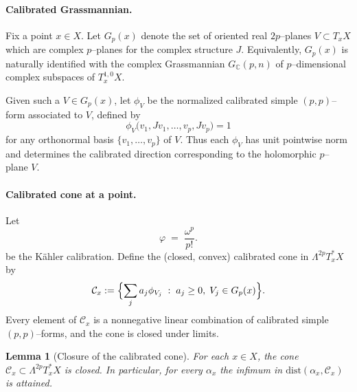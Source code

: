 \documentclass[11pt]{article}
\numberwithin{equation}{section}  %
\theoremstyle{plain}
\newtheorem{lemma}[theorem]{Lemma}
\theoremstyle{definition}
\theoremstyle{remark}
\newcommand{\C}{\mathbb{C}}
\newcommand{\dist}{\mathrm{dist}}
\newcommand{\calibform}{\frac{\omega^{p}}{p!}} %
\newcommand{\Gp}{G_p}
\begin{document}
\paragraph{Calibrated Grassmannian.}
Fix a point $x\in X$.  
Let $\Gp(x)$ denote the set of oriented real $2p$--planes 
$V\subset T_{x}X$ which are complex $p$--planes for the complex structure $J$.
Equivalently, $\Gp(x)$ is naturally identified with the complex
Grassmannian $G_{\C}(p,n)$ of $p$--dimensional complex subspaces of
$T^{1,0}_{x}X$.  

Given such a $V\in \Gp(x)$, let $\phi_{V}$ be the normalized
calibrated simple $(p,p)$--form associated to $V$, defined by
\[
\phi_{V}\bigl( v_{1},Jv_{1},\ldots,v_{p},Jv_{p} \bigr) = 1
\]
for any orthonormal basis $\{v_{1},\ldots,v_{p}\}$ of $V$.
Thus each $\phi_{V}$ has unit pointwise norm and determines the calibrated
direction corresponding to the holomorphic $p$--plane $V$.

\paragraph{Calibrated cone at a point.}
Let
\[
\varphi \;=\; \calibform.
\]
be the K\"ahler calibration.
Define the (closed, convex) calibrated cone in $\Lambda^{2p}T^{*}_{x}X$ by
\[
\mathcal{C}_{x}
:=
\Bigl\{
\sum_{j} a_{j} \phi_{V_{j}}
\;:\;
a_{j}\ge 0,\;
V_{j}\in \Gp(x)
\Bigr\}.
\]
Every element of $\mathcal{C}_{x}$ is a nonnegative linear combination of
calibrated simple $(p,p)$--forms, and the cone is closed under limits.


\begin{lemma}[Closure of the calibrated cone]\label{lem:calibrated-cone-closed}
For each $x\in X$, the cone $\mathcal{C}_{x}\subset \Lambda^{2p}T_x^*X$ is closed.
In particular, for every $\alpha_x$ the infimum in $\dist(\alpha_x,\mathcal{C}_x)$ is attained.
\end{lemma}
\end{document}
